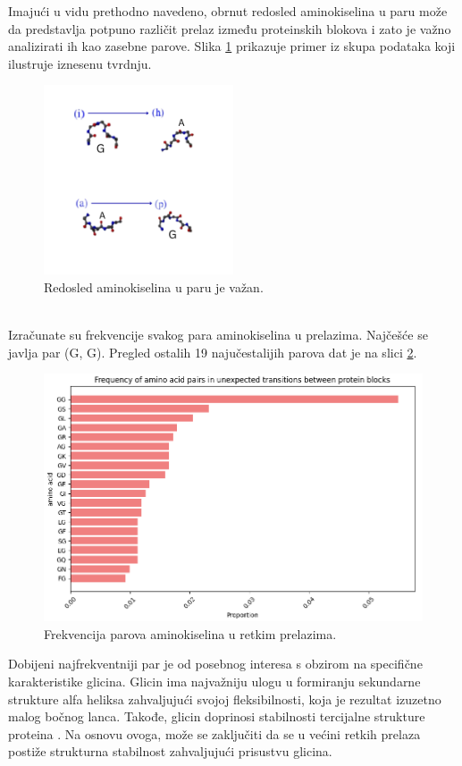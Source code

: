 \documentclass[a4paper,12pt]{article}
\begin{document}
Imajući u vidu prethodno navedeno, obrnut redosled aminokiselina u paru može da predstavlja potpuno različit prelaz između proteinskih blokova i zato je važno analizirati ih kao zasebne parove. Slika \ref{Slika:aa} prikazuje primer iz skupa podataka koji ilustruje iznesenu tvrdnju.
\begin{figure}[htbp]
    \centering
    \includegraphics[width=0.5\textwidth]{./images/aa.png}
    \caption{Redosled aminokiselina u paru je važan.}
    \label{Slika:aa}
\end{figure}
\\
Izračunate su frekvencije svakog para aminokiselina u prelazima. Najčešće se javlja par (G, G). Pregled ostalih 19 najučestalijih parova dat je na slici \ref{Slika:aafreq}.
\begin{figure}[htbp]
    \centering
    \includegraphics[width=1\textwidth]{./images/aafreq.png}
    \caption{Frekvencija parova aminokiselina u retkim prelazima.}
    \label{Slika:aafreq}
\end{figure}
\newpage
Dobijeni najfrekventniji par je od posebnog interesa s obzirom na specifične karakteristike glicina. Glicin ima najvažniju ulogu u formiranju sekundarne strukture alfa heliksa zahvaljujući svojoj fleksibilnosti, koja je rezultat izuzetno malog bočnog lanca. Takođe, glicin doprinosi stabilnosti tercijalne strukture proteina \cite{dong2015glycines}. Na osnovu ovoga, može se zaključiti da se u većini retkih prelaza postiže strukturna stabilnost zahvaljujući prisustvu glicina.
\end{document}
